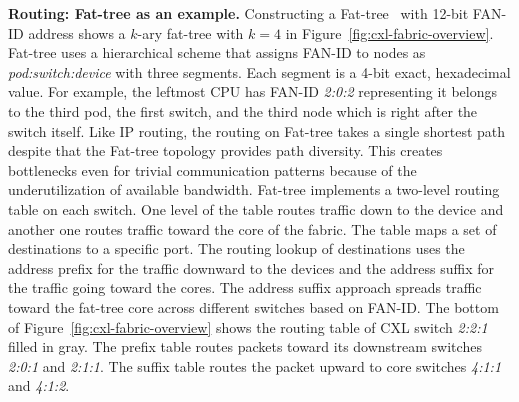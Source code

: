 \noindent \textbf{Routing: Fat-tree as an example.}
%
Constructing a Fat-tree~\cite{fat-tree:sigcomm:2008} with 12-bit FAN-ID address shows a $k$-ary fat-tree with $k=4$ in Figure~\ref{fig:cxl-fabric-overview}.
%
Fat-tree uses a hierarchical scheme that assigns FAN-ID to nodes as \emph{pod:switch:device} with three segments.
%
Each segment is a 4-bit exact, hexadecimal value.  
%
For example, the leftmost CPU has FAN-ID \emph{2:0:2} representing it belongs to the third pod, the first switch, and the third node which is right after the switch itself.
%
Like IP routing, the routing on Fat-tree takes a single shortest path despite that the Fat-tree topology provides path diversity.
%
This creates bottlenecks even for trivial communication patterns because of the underutilization of available bandwidth.
%
Fat-tree implements a two-level routing table on each switch. One level of the table routes traffic down to the device and another one routes traffic toward the core of the fabric.
%
The table maps a set of destinations to a specific port. The routing lookup of destinations uses the address prefix for the traffic downward to the devices and the address suffix for the traffic going toward the cores.
%
The address suffix approach spreads traffic toward the fat-tree core across different switches based on FAN-ID.
%
The bottom of Figure~\ref{fig:cxl-fabric-overview} shows the routing table of CXL switch \emph{2:2:1} filled in gray. The prefix table routes packets toward its downstream switches \emph{2:0:1} and \emph{2:1:1}. The suffix table routes the packet upward to core switches \emph{4:1:1} and \emph{4:1:2}.  
%



